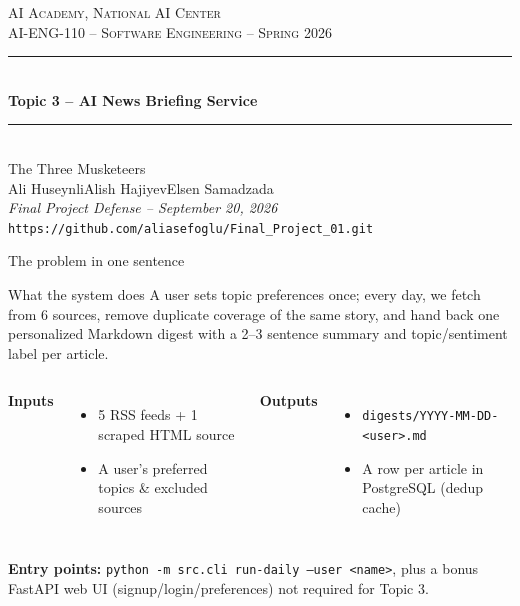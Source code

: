 \documentclass[aspectratio=169,11pt]{beamer}
\newcommand{\teamname}{The Three Musketeers}
\newcommand{\topicchoice}{Topic 3 -- AI News Briefing Service}
\newcommand{\memberone}{Ali Huseynli}
\newcommand{\membertwo}{Alish Hajiyev}
\newcommand{\memberthree}{Elsen Samadzada}
\newcommand{\repolink}{https://github.com/aliasefoglu/Final_Project_01.git}
\newcommand{\coursecode}{AI-ENG-110}
\newcommand{\coursename}{Software Engineering}
\newcommand{\institution}{AI Academy, National AI Center}
\newcommand{\semester}{Spring 2026}
\begin{document}
{%
\begin{frame}[plain]
  \begin{center}
    \vspace{0.6cm}
    {\small \textsc{\institution}}\\[0.2em]
    {\small \textsc{\coursecode{} -- \coursename{} -- \semester{}}}\\[1.2em]
    \rule{0.7\textwidth}{0.6pt}\\[0.4em]
    {\Huge\bfseries\color{accent} \topicchoice}\\[0.4em]
    \rule{0.7\textwidth}{0.6pt}\\[1.2em]
    {\large \teamname}\\[0.6em]
    {\normalsize \memberone\quad\textbullet\quad\membertwo\quad\textbullet\quad\memberthree}\\[1cm]
    {\footnotesize\itshape Final Project Defense -- September 20, 2026}\\[0.4em]
    {\footnotesize\texttt{\repolink}}
  \end{center}
\end{frame}
}

\begin{frame}{The problem in one sentence}
  \begin{block}{What the system does}
    A user sets topic preferences once; every day, we fetch from 6 sources, remove duplicate coverage of the same story, and hand back one personalized Markdown digest with a 2--3 sentence summary and topic/sentiment label per article.
  \end{block}

  \vspace{0.3em}
  \begin{columns}[T,onlytextwidth]
  \textbf{Inputs}
  \begin{itemize}
    \item 5 RSS feeds + 1 scraped HTML source
    \item A user's preferred topics \& excluded sources
  \end{itemize}

  \textbf{Outputs}
  \begin{itemize}
    \item \texttt{digests/YYYY-MM-DD-<user>.md}
    \item A row per article in PostgreSQL (dedup cache)
  \end{itemize}
  \end{columns}

  \vspace{0.4em}
  \textbf{Entry points:} \texttt{python -m src.cli run-daily --user <name>}, plus a bonus FastAPI web UI (signup/login/preferences) not required for Topic 3.
\end{frame}
\end{document}
